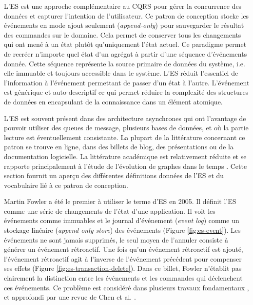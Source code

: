 L'\gls{ES} est une approche complémentaire au \gls{CQRS} pour 
gérer la concurrence des données et capturer l'intention de l'utilisateur. 
Ce patron de conception stocke les événements en mode ajout seulement 
(\textit{append-only}) pour sauvegarder le résultat des commandes sur le 
domaine. Cela permet de conserver tous les changements qui ont mené à un 
état plutôt qu'uniquement l'état actuel. Ce paradigme permet de recréer n'importe quel 
état d'un agrégat à partir d'une séquence d'événements donnée. Cette séquence 
représente la source primaire de données du système, i.e. elle immuable et 
toujours accessible dans le système. 
L'\gls{ES} réduit l'essentiel de l'information à l'événement permettant de passer d'un 
état à l'autre. L'événement est générique et auto-descriptif ce qui permet réduire la 
complexité des structures de données en encapsulant de la connaissance dans un élément 
atomique. 

L'\gls{ES} est souvent présent dans des architecture asynchrones qui ont 
l'avantage de pouvoir utiliser des queues de message, plusieurs bases de 
données, et où la partie lecture est éventuellement consistante.
La plupart de la littérature concernant ce patron se trouve en ligne, dans des 
billets de blog, des présentations ou de la documentation logicielle. La 
littérature académique est relativement réduite et se rapporte principalement
à l'étude de l'évolution de graphes dans le temps \cite{Erb2015,Erb2017}. Cette section fournit un aperçu des différentes 
définitions données de l'\gls{ES} et du vocabulaire lié à ce patron de conception.

Martin Fowler a été le premier à utiliser le terme d'\acrlong{ES} en 2005\cite{Fowler2005}. 
Il définit l'\gls{ES} comme \og une série de changements de l'état d'une 
application\fg{}. Il voit les événements comme immuables et le journal 
d'événement (\textit{event log}) comme un stockage linéaire 
(\textit{append only store}) des événements (Figure \ref{fig:es-event}). 
Les événements ne sont jamais supprimés, le seul moyen de l'\og annuler\fg{} consiste à 
générer un événement rétroactif. 
Une fois qu'un événement rétroactif est ajouté, l'événement rétroactif agit à 
l'inverse de l'événement précédent pour compenser ses effets 
(Figure \ref{fig:es-transaction-delete}). 
Dans ce billet, Fowler n'établit pas clairement la distinction entre les 
événements et les commandes qui déclenchent ces événements. Ce problème est 
considéré dans plusieurs travaux fondamentaux \cite{Prakash1994,Sun2002,Weiss2009a,Weiss2010}, 
et approfondi par une revue de Chen et al. \cite{Cheng2013}.

